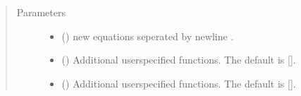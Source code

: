\documentclass[letterpaper,10pt,english]{sphinxmanual}
\begin{document}
\begin{fulllineitems}
\begin{fulllineitems}
\begin{quote}
\begin{description}
\begin{itemize}
\end{itemize}


\end{description}\end{quote}

\end{fulllineitems}


\begin{fulllineitems}
\label{\detokenize{core/modelclass:modelclass.Modify_Mixin.equpdate}}
\pysigstartsignatures
{}
\pysigstopsignatures\begin{quote}\begin{description}
\item[{Parameters}] \leavevmode\begin{itemize}
\item {} 
\sphinxAtStartPar
{} () \textendash{} new equations seperated by newline .

\item {} 
\sphinxAtStartPar
{} (\sphinxstyleliteralemphasis{\sphinxupquote{, }}) \textendash{} Additional userspecified functions. The default is {[}{]}.

\item {} 
\sphinxAtStartPar
{} (\sphinxstyleliteralemphasis{\sphinxupquote{, }}) \textendash{} Additional userspecified functions. The default is {[}{]}.

\end{itemize}


\end{description}
\end{quote}
\end{fulllineitems}
\end{fulllineitems}
\end{document}
